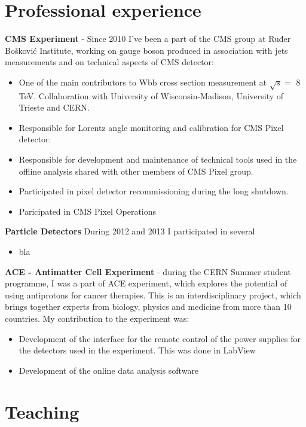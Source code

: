 \documentclass[letterpaper,12pt]{article}
\begin{document}
\section*{Professional experience}

\textbf{CMS Experiment} - Since 2010 I've been a part of the CMS group at Ruđer Bošković Institute, working on gauge boson produced in association with jets measurements and on technical aspects of CMS detector:
\begin{itemize}
\item One of the main contributors to Wbb cross section measurement at $\sqrt{s} =$ 8 TeV. Collaboration with University of Wisconsin-Madison, University of Trieste and CERN.
\item Responsible for Lorentz angle monitoring and calibration for CMS Pixel detector.
\item Responsible for development and maintenance of technical tools used in the offline analysis shared with other members of CMS Pixel group.
\item Participated in pixel detector recommissioning during the long shutdown. 
\item Paricipated in CMS Pixel Operations
\end{itemize}

\textbf{Particle Detectors} During 2012 and 2013 I participated in several 
\begin{itemize}
\item bla
\end{itemize}

\textbf{ACE - Antimatter Cell Experiment} -  during the CERN Summer student programme, I was a part of ACE experiment, which explores the potential of using antiprotons for cancer therapies. This is an interdisciplinary project, which brings together experts from biology, physics and medicine from more than 10 countries. My contribution to the experiment was:
\begin{itemize}
\item Development of the interface for the remote control of the power supplies for the detectors used in the experiment. This was done in LabView 
\item Development of the online data analysis software
\end{itemize}

\section*{Teaching}
\end{document}
